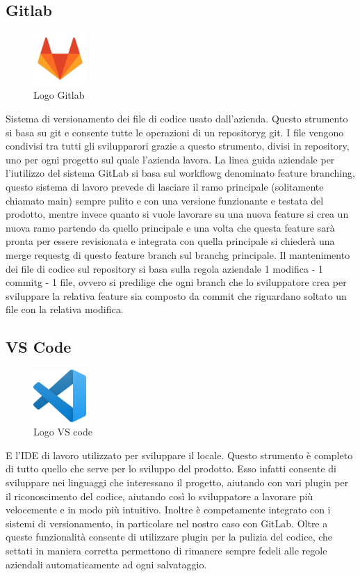 \subsection*{Gitlab}
\begin{figure}[H]
  \centering
  \includegraphics[width=2cm]{immagini/logo-Gitlab.jpg}
  \caption{Logo Gitlab}
\end{figure}
Sistema di versionamento dei file di codice usato dall'azienda. Questo strumento si basa su git e consente tutte le operazioni di un \gls{repositoryg} git.
I file vengono condivisi tra tutti gli svilupparori grazie a questo strumento, divisi in repository, uno per ogni progetto sul quale l'azienda lavora.
La linea guida aziendale per l'iutilizzo del sistema GitLab si basa sul \gls{workflowg} denominato feature branching, questo sistema di lavoro
prevede di lasciare il ramo principale (solitamente chiamato main) sempre pulito e con una versione funzionante e testata del prodotto, mentre invece
quanto si vuole lavorare su una nuova feature si crea un nuova ramo partendo da quello principale e una volta che questa feature sarà pronta per essere
revisionata e integrata con quella principale si chiederà una \gls{merge requestg} di questo feature branch sul \gls{branchg} principale.
Il mantenimento dei file di codice sul repository si basa sulla regola aziendale 1 modifica - 1 \gls{commitg} - 1 file, ovvero si predilige che ogni branch che lo sviluppatore crea per sviluppare la relativa feature
sia composto da commit che riguardano soltato un file con la relativa modifica.

\subsection*{VS Code}
\begin{figure}[H]
  \centering
  \includegraphics[width=2cm]{immagini/logo-VSCode.jpg}
  \caption{Logo VS code}
\end{figure}
E l'\gls{IDE} di lavoro utilizzato per sviluppare il locale. Questo strumento è completo di tutto quello che serve per lo sviluppo del prodotto.
Esso infatti consente di sviluppare nei linguaggi che interessano il progetto, aiutando con vari plugin per il riconoscimento del codice,
aiutando così lo sviluppatore a lavorare più velocemente e in modo più intuitivo. Inoltre è competamente integrato con i sistemi di
versionamento, in particolare nel nostro caso con GitLab. Oltre a queste funzionalità consente di utilizzare plugin per la pulizia del
codice, che settati in maniera corretta permettono di rimanere sempre fedeli alle regole aziendali automaticamente ad ogni salvataggio.

